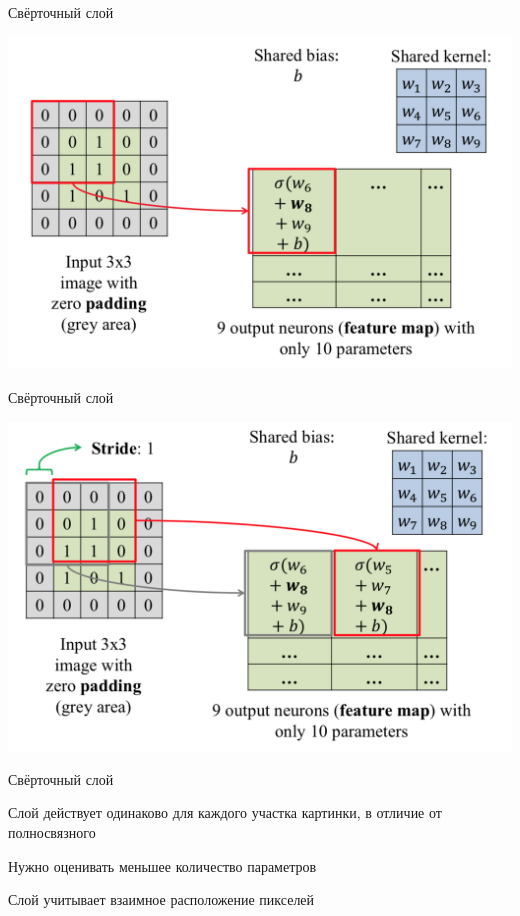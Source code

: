 \documentclass[notes,12pt, aspectratio=169]{beamer}
\newenvironment{wideitemize}{\itemize\addtolength{\itemsep}{10pt}}{\enditemize}
\begin{document}


\begin{frame}{Свёрточный слой}
\begin{center}
	\includegraphics[width=.7\linewidth]{conv_layer.png}
\end{center}
\end{frame}


\begin{frame}{Свёрточный слой}
\begin{center}
	\includegraphics[width=.7\linewidth]{conv_layer_2.png}
\end{center}
\end{frame}



\begin{frame}{Свёрточный слой}
\begin{wideitemize}
	\item  Слой действует одинаково для каждого участка картинки, в отличие от полносвязного 
	\item  Нужно оценивать меньшее количество параметров
	\item  Слой учитывает взаимное расположение пикселей
\end{wideitemize}
\end{frame}
\end{document}
